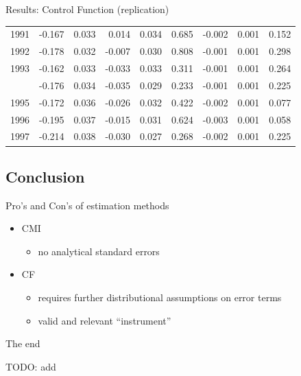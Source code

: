\documentclass[10pt,ignorenonframetext,]{beamer}
\providecommand{\tightlist}{%
  \setlength{\itemsep}{0pt}\setlength{\parskip}{0pt}}
\begin{document}
\begin{frame}{Results: Control Function (replication)}
\begin{longtable}[t]{rrrrrrrrr}
1991 & -0.167 & 0.033 & 0.014 & 0.034 & 0.685 & -0.002 & 0.001 & 0.152\\
1992 & -0.178 & 0.032 & -0.007 & 0.030 & 0.808 & -0.001 & 0.001 & 0.298\\
1993 & -0.162 & 0.033 & -0.033 & 0.033 & 0.311 & -0.001 & 0.001 & 0.264\\
\addlinespace
1994 & -0.176 & 0.034 & -0.035 & 0.029 & 0.233 & -0.001 & 0.001 & 0.225\\
1995 & -0.172 & 0.036 & -0.026 & 0.032 & 0.422 & -0.002 & 0.001 & 0.077\\
1996 & -0.195 & 0.037 & -0.015 & 0.031 & 0.624 & -0.003 & 0.001 & 0.058\\
1997 & -0.214 & 0.038 & -0.030 & 0.027 & 0.268 & -0.002 & 0.001 & 0.225\\*
\end{longtable}\endgroup{}

\end{frame}

\hypertarget{conclusion}{%
\subsection{Conclusion}\label{conclusion}}

\begin{frame}{Pro's and Con's of estimation methods}
\protect\hypertarget{pros-and-cons-of-estimation-methods}{}

\begin{itemize}
\tightlist
\item
  CMI

  \begin{itemize}
  \tightlist
  \item
    no analytical standard errors
  \end{itemize}
\item
  CF

  \begin{itemize}
  \tightlist
  \item
    requires further distributional assumptions on error terms
  \item
    valid and relevant ``instrument''
  \end{itemize}
\end{itemize}

\end{frame}

\begin{frame}[allowframebreaks]{The end}
\protect\hypertarget{the-end}{}

TODO: add

\end{frame}
\end{document}
